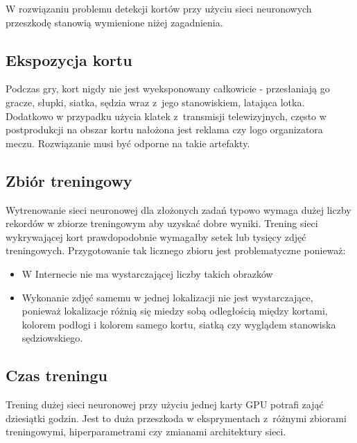 W rozwiązaniu problemu detekcji kortów przy użyciu sieci neuronowych przeszkodę stanowią wymienione niżej zagadnienia.

\subsection*{Ekspozycja kortu}

Podczas gry, kort nigdy nie jest wyeksponowany całkowicie - przesłaniają go gracze, słupki, siatka, sędzia wraz z~jego stanowiskiem, latająca lotka. Dodatkowo w przypadku użycia klatek z~transmisji telewizyjnych, często w postprodukcji na obszar kortu nałożona jest reklama czy logo organizatora meczu. Rozwiązanie musi być odporne na takie artefakty.

\subsection*{Zbiór treningowy}

Wytrenowanie sieci neuronowej dla złożonych zadań typowo wymaga dużej liczby rekordów w zbiorze treningowym aby uzyskać dobre wyniki. Trening sieci wykrywającej kort prawdopodobnie wymagałby setek lub tysięcy zdjęć treningowych. Przygotowanie tak licznego zbioru jest problematyczne ponieważ:

\begin{itemize}
	\item W Internecie nie ma wystarczającej liczby takich obrazków
	\item Wykonanie zdjęć samemu w jednej lokalizacji nie jest wystarczające, ponieważ lokalizacje różnią się miedzy sobą odległością między kortami, kolorem podłogi i kolorem samego kortu, siatką czy wyglądem stanowiska sędziowskiego.
\end{itemize}

\subsection*{Czas treningu}

Trening dużej sieci neuronowej przy użyciu jednej karty GPU potrafi zająć dziesiątki godzin. Jest to duża przeszkoda w eksprymentach z~różnymi zbiorami treningowymi, hiperparametrami czy zmianami architektury sieci.
